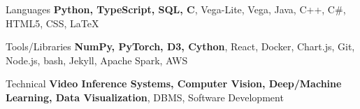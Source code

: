 

\begin{cvskills}

  \cvskill
    {Languages} %
    {{\bf Python, TypeScript, SQL, C}, Vega-Lite, Vega, Java, C++, C\#, HTML5, CSS, LaTeX} %

  \cvskill
    {Tools/Libraries} %
    {{\bf NumPy, PyTorch, D3, Cython}, React, Docker, Chart.js, Git, Node.js, bash, Jekyll, Apache Spark, AWS} %

  \cvskill
    {Technical} %
    {{\bf Video Inference Systems, Computer Vision, Deep/Machine Learning, Data Visualization}, DBMS, Software Development} %


\end{cvskills}